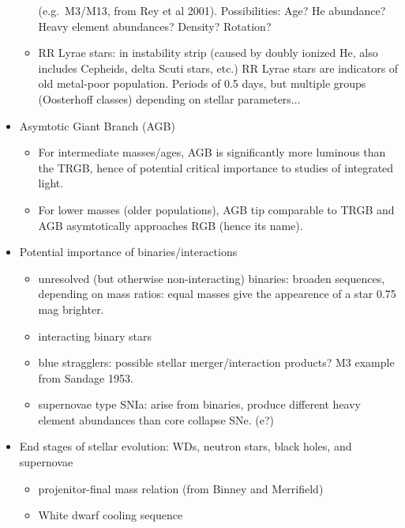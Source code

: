 \documentclass{article}
\begin{document}
\begin{itemize}
\begin{itemize}
                (e.g.\ {M3/M13}, from {Rey et al
                2001}). Possibilities: Age? He abundance? Heavy element
                abundances? Density? Rotation?
            \item RR Lyrae stars: in instability strip (caused by doubly
                ionized He, also includes Cepheids, delta Scuti stars, etc.)
                RR Lyrae stars are indicators of old metal-poor population.
                Periods of 0.5 days, but multiple groups (Oosterhoff classes)
                depending on stellar parameters$\ldots$
        \end{itemize}
    \item Asymtotic Giant Branch (AGB)
        \begin{itemize}
            \item For intermediate masses/ages, AGB is significantly more
                luminous than the TRGB, hence of potential critical importance
                to studies of integrated light.
            \item For lower masses (older populations), AGB tip comparable
                to TRGB and AGB asymtotically approaches RGB (hence its name).
        \end{itemize}
    \item Potential importance of binaries/interactions
        \begin{itemize}
            \item unresolved (but otherwise non-interacting) binaries:
                broaden sequences, depending on mass ratios: equal masses
                give the appearence of a star 0.75 mag brighter.
            \item interacting binary stars
            \item blue stragglers: possible stellar merger/interaction products?
                {M3 example} from Sandage 1953.
            \item supernovae type SNIa: arise from binaries, produce different
                heavy element abundances than core collapse SNe. (e?)
        \end{itemize}
    \item End stages of stellar evolution:
        WDs, neutron stars, black holes, and supernovae
        \begin{itemize}
            \item {projenitor-final mass relation}
                (from Binney and Merrifield)
            \item {White dwarf cooling sequence}

\end{itemize}
\end{itemize}
\end{document}
